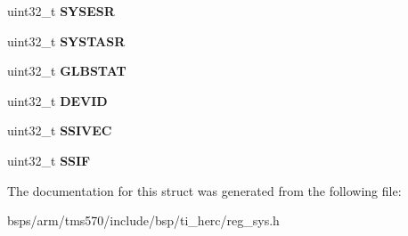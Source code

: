 \begin{DoxyCompactItemize}
\mbox{\label{structtms570__sys1__t_a5d23b2428b313eb197f16b35e392d7ba}} 
uint32\+\_\+t {\bfseries S\+Y\+S\+E\+SR}
\item 
\mbox{\label{structtms570__sys1__t_a060e94d5acc140cff43dc46dba0ace45}} 
uint32\+\_\+t {\bfseries S\+Y\+S\+T\+A\+SR}
\item 
\mbox{\label{structtms570__sys1__t_a39d8a2daeb51b21f8de894812f5c9b6e}} 
uint32\+\_\+t {\bfseries G\+L\+B\+S\+T\+AT}
\item 
\mbox{\label{structtms570__sys1__t_ae5347acbca64e5eb443e086e3e8c2d25}} 
uint32\+\_\+t {\bfseries D\+E\+V\+ID}
\item 
\mbox{\label{structtms570__sys1__t_ae90aad58044090b9f00a3586395f89ec}} 
uint32\+\_\+t {\bfseries S\+S\+I\+V\+EC}
\item 
\mbox{\label{structtms570__sys1__t_ab301775c55e8958f732ba3de6a6198de}} 
uint32\+\_\+t {\bfseries S\+S\+IF}
\end{DoxyCompactItemize}


The documentation for this struct was generated from the following file\+:\begin{DoxyCompactItemize}
\item 
bsps/arm/tms570/include/bsp/ti\+\_\+herc/reg\+\_\+sys.\+h\end{DoxyCompactItemize}
